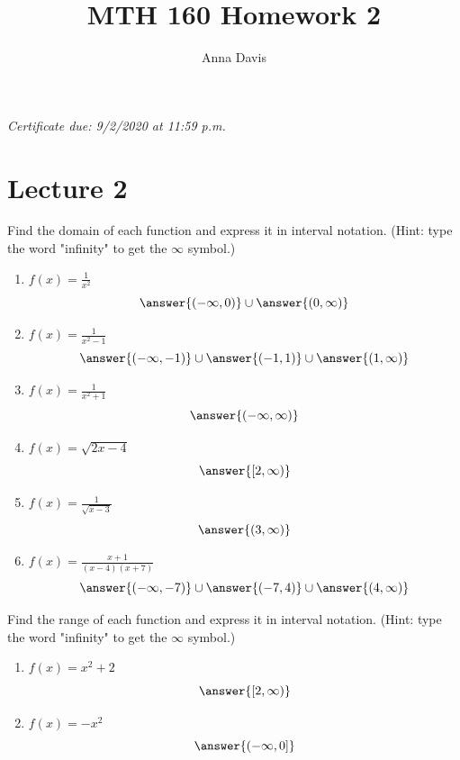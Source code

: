 \documentclass{ximera}
\author{Anna Davis} \title{MTH 160 Homework 2}
\begin{document}
\begin{abstract}

\end{abstract}
\maketitle
 \textit{Certificate due: 9/2/2020 at 11:59 p.m.}
 \section{Lecture 2}
\begin{problem}\label{prob:160hom2prob1}
Find the domain of each function and express it in interval notation.  (Hint: type the word "infinity" to get the $\infty$ symbol.)
\begin{enumerate}
    \item $f(x)=\frac{1}{x^2}$
    $$\answer{(-\infty,0)}\cup\answer{(0,\infty)}$$
    \item $f(x)=\frac{1}{x^2-1}$
    $$\answer{(-\infty,-1)}\cup\answer{(-1,1)}\cup\answer{(1,\infty)}$$
    \item $f(x)=\frac{1}{x^2+1}$
    $$\answer{(-\infty,\infty)}$$
    \item $f(x)=\sqrt{2x-4}$
    $$\answer{[2,\infty)}$$
     \item $f(x)=\frac{1}{\sqrt{x-3}}$
    $$\answer{(3,\infty)}$$
    \item $f(x)=\frac{x+1}{(x-4)(x+7)}$
    $$\answer{(-\infty,-7)}\cup\answer{(-7,4)}\cup\answer{(4,\infty)}$$
\end{enumerate}
\end{problem}

\begin{problem}\label{prob:160hom2prob2}
  Find the range of each function and express it in interval notation.  (Hint: type the word "infinity" to get the $\infty$ symbol.)
  \begin{enumerate}
      \item $f(x)=x^2+2$
      $$\answer{[2,\infty)}$$
      \item $f(x)=-x^2$
      $$\answer{(-\infty,0]}$$
  \end{enumerate}
\end{problem}
\end{document}

